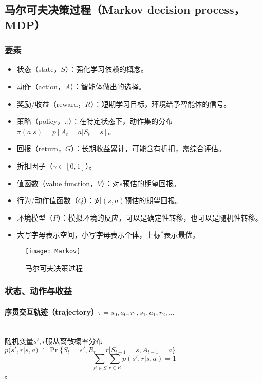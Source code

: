 \documentclass[
12pt, %
a4paper, 
oneside, %
headinclude,footinclude, %
]{scrartcl}
\begin{document}
\subsection[马尔可夫决策过程]{马尔可夫决策过程（Markov decision process，MDP）}
\subsubsection[要素]{要素}
\begin{itemize}
\item 状态（state，$ S $）：强化学习依赖的概念。
\item 动作（action，$ A $）：智能体做出的选择。
\item 奖励/收益（reward，$ R $）：短期学习目标，环境给予智能体的信号。
\item 策略（policy，$ \pi $）：在特定状态下，动作集的分布$ \pi(a|s) = p[A_t = a|S_t = s] $。
\item 回报（return，$ G $）：长期收益累计，可能含有折扣，需综合评估。
\item 折扣因子（$ \gamma \in [0, 1] $）。
\item 值函数（value function，$ V $）：对$ s $预估的期望回报。
\item 行为/动作值函数（$ Q $）：对$ (s, a) $预估的期望回报。
\item 环境模型（$ P $）：模拟环境的反应，可以是确定性转移，也可以是随机性转移。
\item 大写字母表示空间，小写字母表示个体，上标$ ^* $表示最优。
\end{itemize}

\begin{figure}[H]
\centering 
\texttt{[image: Markov]} 
\caption[马尔可夫决策过程]{马尔可夫决策过程}
\end{figure}
\subsubsection[状态、动作与收益]{状态、动作与收益}
\paragraph{序贯交互轨迹（trajectory）$ \tau =  s_0, a_0, r_1, s_1, a_1, r_2, \dots $}~\\

随机变量$ s',r $服从离散概率分布$ p(s', r|s, a) \doteq \Pr\{S_t = s', R_t = r|S_{t - 1} = s, A_{t - 1} = a\} $
$$ \sum_{s' \in S}\sum_{r \in R} p(s', r|s, a) = 1 $$。
\end{document}
